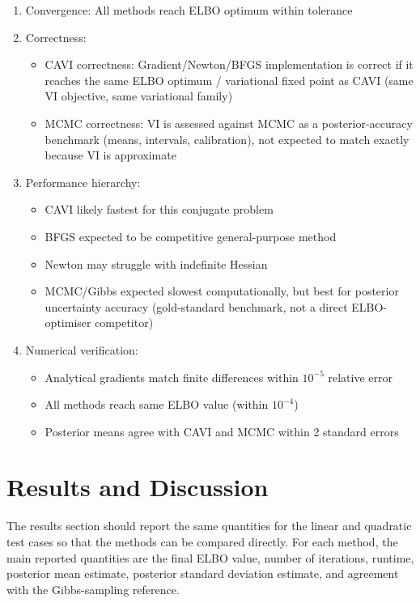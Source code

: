\documentclass[11pt,a4paper]{article}
\begin{document}
\begin{enumerate}
\item Convergence: All methods reach ELBO optimum within tolerance
\item Correctness:
\begin{itemize}
\item CAVI correctness: Gradient/Newton/BFGS implementation is correct if it reaches the same ELBO optimum / variational fixed point as CAVI (same VI objective, same variational family)
\item MCMC correctness: VI is assessed against MCMC as a posterior-accuracy benchmark (means, intervals, calibration), not expected to match exactly because VI is approximate
\end{itemize}
\item Performance hierarchy:
\begin{itemize} 
\item CAVI likely fastest for this conjugate problem
\item BFGS expected to be competitive general-purpose method
\item Newton may struggle with indefinite Hessian
\item MCMC/Gibbs expected slowest computationally, but best for posterior uncertainty accuracy (gold-standard benchmark, not a direct ELBO-optimiser competitor)
\end{itemize}
\item Numerical verification:
\begin{itemize}
\item Analytical gradients match finite differences within $10^{-5}$ relative error
\item All methods reach same ELBO value (within $10^{-4}$)
\item Posterior means agree with CAVI and MCMC within 2 standard errors
\end{itemize}
\end{enumerate}
 
\section*{Results and Discussion}

The results section should report the same quantities for the linear and quadratic test cases so that the methods can be compared directly. For each method, the main reported quantities are the final ELBO value, number of iterations, runtime, posterior mean estimate, posterior standard deviation estimate, and agreement with the Gibbs-sampling reference.
\end{document}
